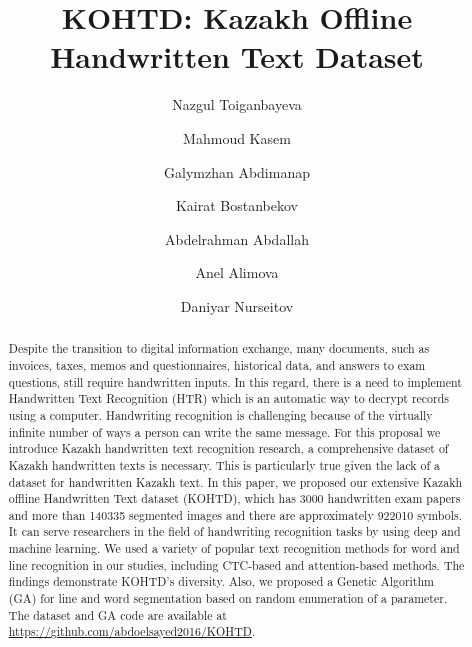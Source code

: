 \documentclass[preprint,12pt]{elsarticle}
\begin{document}
\begin{frontmatter}





\title{KOHTD: Kazakh Offline Handwritten Text Dataset}



\author[inst1]{Nazgul Toiganbayeva}


\author[inst4]{Mahmoud Kasem}


\author[inst3,inst4]{Galymzhan Abdimanap}


\author[inst3,inst4]{Kairat Bostanbekov}


\author[inst3,inst5]{Abdelrahman Abdallah}


\author[inst3,inst4]{Anel Alimova}


\author[inst3,inst4]{Daniyar Nurseitov}






\begin{abstract}
Despite the transition to digital information exchange, many documents, such as invoices, taxes, memos and questionnaires, historical data, and answers to exam questions, still require handwritten inputs. In this regard, there is a need to implement Handwritten Text Recognition (HTR) which is an automatic way to decrypt records using a computer. Handwriting recognition is challenging because of the virtually infinite number of ways a person can write the same message. For this proposal we introduce Kazakh handwritten text recognition research, a comprehensive dataset of Kazakh handwritten texts is necessary. This is particularly true given the lack of a dataset for handwritten Kazakh text. In this paper, we proposed our extensive Kazakh offline Handwritten Text dataset (KOHTD), which has 3000 handwritten exam papers and  more than 140335 segmented images and there are approximately 922010 symbols. It can serve researchers in the field of handwriting recognition tasks by using deep and machine learning. We used a variety of popular text recognition methods for word and line recognition in our studies, including CTC-based and attention-based methods. The findings demonstrate KOHTD's diversity. Also, we proposed a Genetic Algorithm (GA) for line and word segmentation based on random enumeration of a parameter. The dataset and GA code are available at \url{https://github.com/abdoelsayed2016/KOHTD}. 
\end{abstract}



\end{frontmatter}
\end{document}
